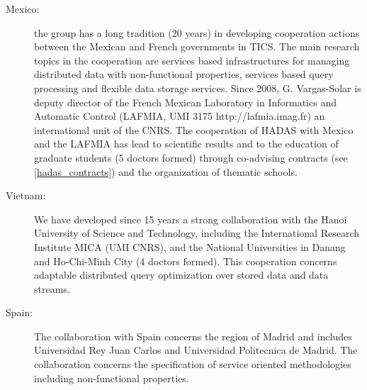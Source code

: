 \begin{description}
\item[Mexico:] the group has a long tradition (20 years) in developing cooperation actions between the Mexican and French governments in TICS. 
The main research topics in the cooperation are services based infrastructures for managing distributed data with non-functional properties, services based query processing and flexible data storage services.  
Since 2008, G. Vargas-Solar is deputy director of the French Mexican Laboratory in Informatics and Automatic Control (LAFMIA, UMI 3175 http://lafmia.imag.fr) an international unit of the CNRS.  The cooperation of HADAS with Mexico and the LAFMIA has lead to scientific results and to the education of graduate students (5 doctors formed) through co-advising contracts (see \ref{hadas_contracts}) and the organization of thematic schools. 

\item[Vietnam:] We have developed since 15 years a strong collaboration with the Hanoi University of Science and Technology, including the International Research Institute MICA (UMI CNRS), and the National Universities in Danang and Ho-Chi-Minh City (4 doctors formed). This cooperation concerns adaptable distributed query optimization over stored data and data streams. 

\item[Spain:] 
The collaboration with Spain concerns the region of Madrid and includes Universidad Rey Juan Carlos and Universidad Politecnica de Madrid. The collaboration concerns the specification of service oriented methodologies including non-functional properties. 


\end{description}
